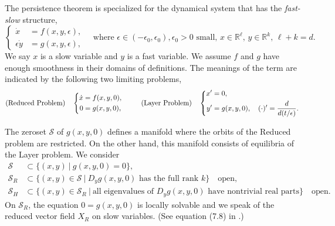 \documentclass[a4paper,11pt]{article}
\theoremstyle{remark}
\begin{document}
The persistence theorem is specialized for the dynamical system that has the {\it fast-slow} structure, 
\begin{equation} \label{eq:fast-slow}
 \left\{
 \begin{aligned}
  \dot{x}&=f(x,y,\epsilon),\\
  \epsilon\dot{y}&=g(x,y,\epsilon),
 \end{aligned}\right. \quad \text{where $\epsilon \in (-\epsilon_0,\epsilon_0), \epsilon_0>0$ small, $x\in \mathbb{R}^\ell$, $y\in \mathbb{R}^k$, $\ell+k=d$.}
\end{equation}
We say $x$ is a slow variable and $y$ is a fast variable. We assume $f$ and $g$ have enough smoothness in their domains of definitions. The meanings of the term are indicated by the following two limiting problems,
\begin{equation*} %
 \text{(Reduced Problem)}\quad\left\{
 \begin{aligned}
    \dot{x} &= f(x,y,0),\\
    0&= g(x,y,0),
 \end{aligned}\right. 
 \hspace{2.5em}
 \text{(Layer Problem)} \quad  
 \left\{
 \begin{aligned}
    x'&= 0,\\
    y'&= g(x,y,0), \quad (\cdot)' = \frac{d}{d(t/\epsilon)}.%
 \end{aligned}\right. 
\end{equation*}

The zeroset $\mathcal{S}$ of $g(x,y,0)$ defines a manifold where the orbits of the Reduced problem are restricted. On the other hand, this manifold consists of equilibria of the Layer problem. We consider 
\begin{align*}
 \mathcal{S}&\subset \Big\{ (x,y)\:\Big|\: g(x,y,0)=0\Big\},\\
 \mathcal{S}_R&\subset \Big\{ (x,y)\in \mathcal{S} \:\Big|\: \text{$D_y g(x,y,0)$ has the full rank $k$}\Big\} \quad \text{open},\\
 \mathcal{S}_H&\subset \Big\{ (x,y)\in \mathcal{S}_R \:\Big|\: \text{all eigenvalues of $D_y g(x,y,0)$ have nontrivial real parts}\Big\}\quad \text{open}. 
\end{align*}
On $\mathcal{S}_R$, the equation $0=g(x,y,0)$ is locally solvable and we speak of the reduced vector field $X_R$ on slow variables. (See equation (7.8) in \cite{fenichel_geometric_1979}.) %
\end{document}
